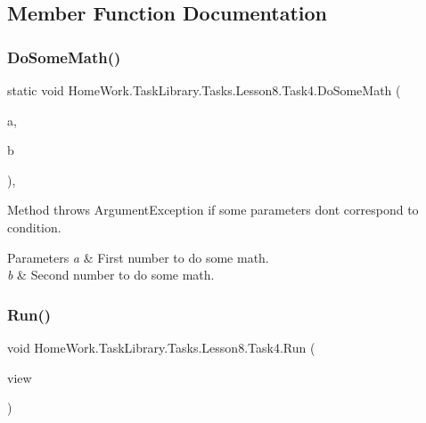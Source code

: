 \subsection{Member Function Documentation}
\mbox{\label{class_home_work_1_1_task_library_1_1_tasks_1_1_lesson8_1_1_task4_abaf765fbbd26120a5c245a3b32e1229c}} 
\subsubsection{\texorpdfstring{DoSomeMath()}{DoSomeMath()}}
{\footnotesize\ttfamily static void Home\+Work.\+Task\+Library.\+Tasks.\+Lesson8.\+Task4.\+Do\+Some\+Math (\begin{DoxyParamCaption}\item[{int}]{a,  }\item[{int}]{b }\end{DoxyParamCaption})\hspace{0.3cm}{\ttfamily [static]}, {\ttfamily [private]}}



Method throws Argument\+Exception if some parameters don\textquotesingle{}t correspond to condition. 


\begin{DoxyParams}{Parameters}
{\em a} & First number to do some math.\\
\hline
{\em b} & Second number to do some math.\\
\hline
\end{DoxyParams}
\mbox{\label{class_home_work_1_1_task_library_1_1_tasks_1_1_lesson8_1_1_task4_aae175a76e9321e07895e506e7726dc79}} 
\subsubsection{\texorpdfstring{Run()}{Run()}}
{\footnotesize\ttfamily void Home\+Work.\+Task\+Library.\+Tasks.\+Lesson8.\+Task4.\+Run (\begin{DoxyParamCaption}\item[{I\+Information}]{view }\end{DoxyParamCaption})}



